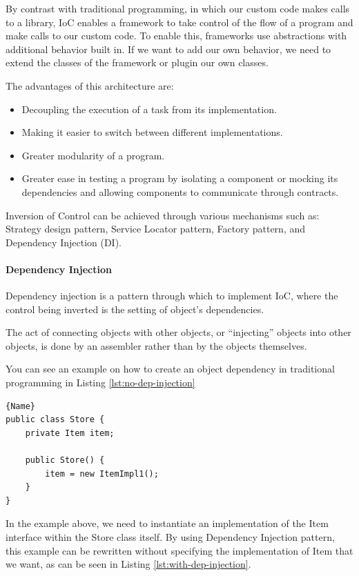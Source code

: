 \documentclass[thesis=M,english,hidelinks]{FITthesis}[2019/12/23]
\begin{document}
By contrast with traditional programming, in which our custom code makes calls to a library, IoC enables a framework to take control of the flow of a program and make calls to our custom code. To enable this, frameworks use abstractions with additional behavior built in. If we want to add our own behavior, we need to extend the classes of the framework or plugin our own classes.

The advantages of this architecture are:

\begin{itemize}
	\item Decoupling the execution of a task from its implementation.
	\item Making it easier to switch between different implementations.
	\item Greater modularity of a program.
	\item Greater ease in testing a program by isolating a component or mocking its dependencies and allowing components to communicate through contracts.
\end{itemize}


Inversion of Control can be achieved through various mechanisms such as: Strategy design pattern, Service Locator pattern, Factory pattern, and Dependency Injection (DI).

\paragraph{Dependency Injection}

Dependency injection is a pattern through which to implement IoC, where the control being inverted is the setting of object's dependencies.

The act of connecting objects with other objects, or “injecting” objects into other objects, is done by an assembler rather than by the objects themselves.

You can see an example on how to create an object dependency in traditional programming in Listing \ref{lst:no-dep-injection}


\begin{lstlisting}[caption=Example class without a Dependency Injection,frame=tlrb,  label = {lst:no-dep-injection}]{Name}
public class Store {
	private Item item;

	public Store() {
		item = new ItemImpl1();    
	}
}
\end{lstlisting}

In the example above, we need to instantiate an implementation of the Item interface within the Store class itself. By using Dependency Injection pattern, this example can be rewritten without specifying the implementation of Item that we want, as can be seen in Listing \ref{lst:with-dep-injection}.
\end{document}
